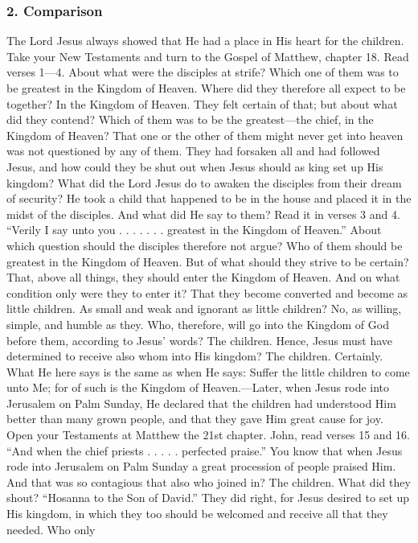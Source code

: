 \subsubsection{2. Comparison} The Lord Jesus always showed that He had a place in His heart for the children. Take your New Testaments and turn to the Gospel of Matthew, chapter 18. Read verses 1—4. About what were the disciples at strife? Which one of them was to be greatest in the Kingdom of Heaven. Where did they therefore all expect to be together? In the Kingdom of Heaven. They felt certain of that; but about what did they contend? Which of them was to be the greatest—the chief, in the Kingdom of Heaven? That one or the other of them might never get into heaven was not questioned by any of them. They had forsaken all and had followed Jesus, and how could they be shut out when Jesus should as king set up His kingdom? What did the Lord Jesus do to awaken the disciples from their dream of security? He took a child that happened to be in the house and placed it in the midst of the disciples. And what did He say to them? Read it in verses 3 and 4. “Verily I say unto you . . . . . . . greatest in the Kingdom of Heaven.” About which question should the disciples therefore not argue? Who of them should be greatest in the Kingdom of Heaven. But of what should they strive to be certain? That, above all things, they should enter the Kingdom of Heaven. And on what condition only were they to enter it? That they become converted and become as little children. As small and weak and ignorant as little children? No, as willing, simple, and humble as they. Who, therefore, will go into the Kingdom of God before them, according to Jesus’ words? The children. Hence, Jesus must have determined to receive also whom into His kingdom? The children. Certainly. What He here says is the same as when He says: Suffer the little children to come unto Me; for of such is the Kingdom of Heaven.—Later, when Jesus rode into Jerusalem on Palm Sunday, He declared that the children had understood Him better than many grown people, and that they gave Him great cause for joy. Open your Testaments at Matthew the 21st chapter. John, read verses 15 and 16. “And when the chief priests . . . . . perfected praise.” You know that when Jesus rode into Jerusalem on Palm Sunday a great procession of people praised Him. And that was so contagious that also who joined in? The children. What did they shout? “Hosanna to the Son of David.” They did right, for Jesus desired to set up His kingdom, in which they too should be welcomed and receive all that they needed. Who only
